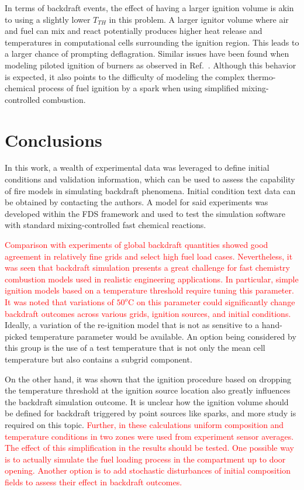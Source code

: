 \documentclass[12pt,letterpaper]{article}
\begin{document}
\begin{flushleft}
In terms of backdraft events, the effect of having a larger ignition volume is akin to using a slightly lower $T_{TH}$ in this problem. A larger ignitor volume where air and fuel can mix and react potentially produces higher heat release and temperatures in computational cells surrounding the ignition region. This leads to a larger chance of prompting deflagration. Similar issues have been found when modeling piloted ignition of burners as observed in Ref.~\cite{White:2017}. Although this behavior is expected, it also points to the difficulty of modeling the complex thermo-chemical process of fuel ignition by a spark when using simplified mixing-controlled combustion.

\section{Conclusions}
\label{sec:concl}

In this work, a wealth of experimental data was leveraged to define initial conditions and validation information, which can be used to assess the capability of fire models in simulating backdraft phenomena. Initial condition text data can be obtained by contacting the authors. A model for said experiments was developed within the FDS framework and used to test the simulation software with standard mixing-controlled fast chemical reactions.

\textcolor{red}{Comparison with experiments of global backdraft quantities showed good agreement in relatively fine grids and select high fuel load cases. Nevertheless, it was seen that backdraft simulation presents a great challenge for fast chemistry combustion models used in realistic engineering applications. In particular, simple ignition models based on a temperature threshold require tuning this parameter. It was noted that variations of $50^o$C on this parameter could significantly change backdraft outcomes across various grids, ignition sources, and initial conditions.} Ideally, a variation of the re-ignition model that is not as sensitive to a hand-picked temperature parameter would be available. An option being considered by this group is the use of a test temperature that is not only the mean cell temperature but also contains a subgrid component. 

On the other hand, it was shown that the ignition procedure based on dropping the temperature threshold at the ignition source location also greatly influences the backdraft simulation outcome. It is unclear how the ignition volume should be defined for backdraft triggered by point sources like sparks, and more study is required on this topic. \textcolor{red}{Further, in these calculations uniform composition and temperature conditions in two zones were used from experiment sensor averages. The effect of this simplification in the results should be tested. One possible way is to actually simulate the fuel loading process in the compartment up to door opening. Another option is to add stochastic disturbances of initial composition fields to assess their effect in backdraft outcomes.} 


\end{flushleft}
\end{document}
